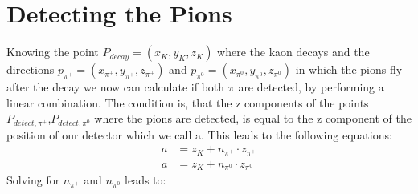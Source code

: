 \documentclass[10pt,a4paper]{report}
\begin{document}
\section{Detecting the Pions}

Knowing the point $P_{decay}=(x_K,y_K,z_K)$  where the kaon decays and the directions $p_{\pi^+}=(x_{\pi^+},y_{\pi^+},z_{\pi^+})$ and $p_{\pi^0}=(x_{\pi^0},y_{\pi^0},z_{\pi^0})$ in which the pions fly after the decay we now can calculate if both $\pi$ are detected, by performing a linear combination. The condition is, that the z components of the points $P_{detect,\pi^+}$,$P_{detect,\pi^0}$ where the pions are detected, is equal to the z component of the position of our detector which we call a. This leads to the following equations:
\begin{align*}
a &= z_K + n_{\pi^+} \cdot z_{\pi^+} \\ 
a &= z_K + n_{\pi^0} \cdot z_{\pi^0}
\end{align*} 
Solving for $n_{\pi^+}$ and  $n_{\pi^0}$ leads to: 
\end{document}
